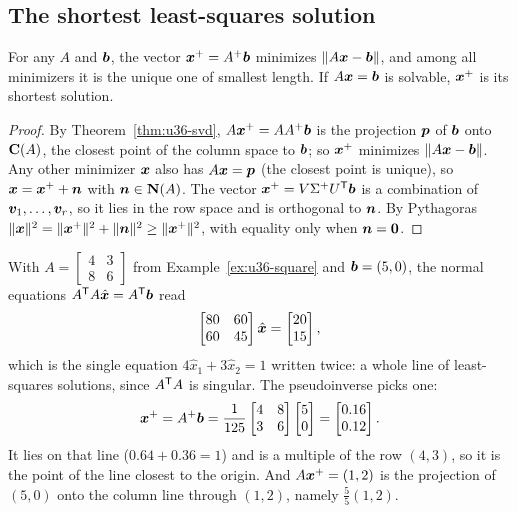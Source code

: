 \subsection{The shortest least-squares solution}

\begin{theorem}\label{thm:u36-minnorm}
For any $A$ and $\boldsymbol{b}$, the vector $\boldsymbol{x}^{+}=A^{+}\boldsymbol{b}$ minimizes $\|A\boldsymbol{x}-\boldsymbol{b}\|$, and among all minimizers it is the unique one of smallest length. If $A\boldsymbol{x}=\boldsymbol{b}$ is solvable, $\boldsymbol{x}^{+}$ is its shortest solution.
\end{theorem}
\begin{proof}
By Theorem~\ref{thm:u36-svd}, $A\boldsymbol{x}^{+}=AA^{+}\boldsymbol{b}$ is the projection $\boldsymbol{p}$ of $\boldsymbol{b}$ onto $\mathbf{C}(A)$, the closest point of the column space to $\boldsymbol{b}$; so $\boldsymbol{x}^{+}$ minimizes $\|A\boldsymbol{x}-\boldsymbol{b}\|$. Any other minimizer $\boldsymbol{x}$ also has $A\boldsymbol{x}=\boldsymbol{p}$ (the closest point is unique), so $\boldsymbol{x}=\boldsymbol{x}^{+}+\boldsymbol{n}$ with $\boldsymbol{n}\in\mathbf{N}(A)$. The vector $\boldsymbol{x}^{+}=V\Sigma^{+}U^{\mathsf{T}}\boldsymbol{b}$ is a combination of $\boldsymbol{v}_1,\dots,\boldsymbol{v}_r$, so it lies in the row space and is orthogonal to $\boldsymbol{n}$. By Pythagoras $\|\boldsymbol{x}\|^{2}=\|\boldsymbol{x}^{+}\|^{2}+\|\boldsymbol{n}\|^{2}\ge\|\boldsymbol{x}^{+}\|^{2}$, with equality only when $\boldsymbol{n}=\boldsymbol{0}$.
\end{proof}

\begin{example}\label{ex:u36-lsq}
With $A=\begin{bmatrix}4&3\\8&6\end{bmatrix}$ from Example~\ref{ex:u36-square} and $\boldsymbol{b}=(5,0)$, the normal equations $A^{\mathsf{T}} A\hat{\boldsymbol{x}}=A^{\mathsf{T}}\boldsymbol{b}$ read
\[
\begin{bmatrix}80&60\\60&45\end{bmatrix}\hat{\boldsymbol{x}}=\begin{bmatrix}20\\15\end{bmatrix},
\]
which is the single equation $4\hat x_1+3\hat x_2=1$ written twice: a whole line of least-squares solutions, since $A^{\mathsf{T}} A$ is singular. The pseudoinverse picks one:
\[
\boldsymbol{x}^{+}=A^{+}\boldsymbol{b}=\frac{1}{125}\begin{bmatrix}4&8\\3&6\end{bmatrix}\begin{bmatrix}5\\0\end{bmatrix}=\begin{bmatrix}0.16\\0.12\end{bmatrix}.
\]
It lies on that line ($0.64+0.36=1$) and is a multiple of the row $(4,3)$, so it is the point of the line closest to the origin. And $A\boldsymbol{x}^{+}=(1,2)$ is the projection of $(5,0)$ onto the column line through $(1,2)$, namely $\frac{5}{5}(1,2)$.
\end{example}

